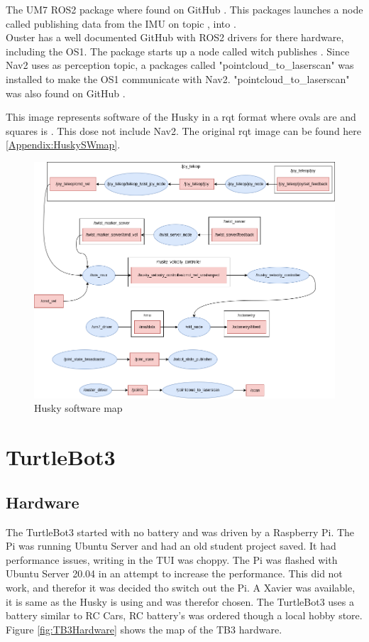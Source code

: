 The UM7 ROS2 package where found on GitHub \cite{um7imu}. This packages launches a node called  publishing data from the IMU on topic , into .
\\ \newline
Ouster has a well documented GitHub \cite{ousterros} with ROS2 drivers for there hardware, including the OS1. The package starts up a node called  witch publishes . 
Since Nav2 uses  as perception topic, a packages called "pointcloud\_to\_laserscan" \cite{pcl2laser} was installed to make the OS1 communicate with Nav2. "pointcloud\_to\_laserscan" was also found on GitHub . 

This image represents software of the Husky in a rqt format where 
ovals are  and squares is . This dose not include Nav2. The original rqt image can be found here \ref{Appendix:HuskySWmap}. 

\begin{figure}[H]
    \centering
    \includegraphics[width = 1\textwidth]{Figures/drawio/husky_rqt.drawio.png}
    \caption{Husky software map}
    \label{fig:HuskySW}
\end{figure}

\section{TurtleBot3}
\subsection{Hardware}
The TurtleBot3 started with no battery and was driven by a Raspberry Pi. The Pi was running Ubuntu Server and had an old student project saved. It had performance issues, writing in the TUI was choppy. The Pi was flashed with Ubuntu Server 20.04 in an attempt to increase the performance. This did not work, and therefor it was decided tho switch out the Pi. A Xavier was available, it is same as the Husky is using and was therefor chosen. The TurtleBot3 uses a battery similar to RC Cars, RC battery's was ordered though a local hobby store. Figure \ref{fig:TB3Hardware} shows the map of the TB3 hardware. 

